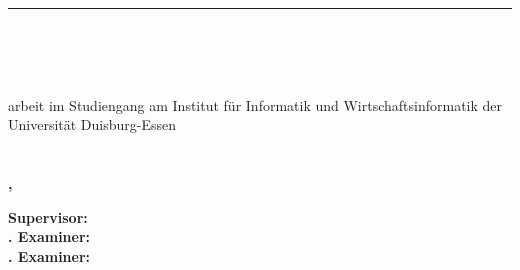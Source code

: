 %

\begin{titlepage}
\rule{\textwidth}{0.4pt} \\[48pt]
\begin{center}
\begin{spacing}{2}
\textbf{\textsf{\Huge \titel}} \\
\textsf{\Large \untertitel}\\[52pt]

\textsf{\Large {\arbeitsart}arbeit im Studiengang {\studiengang} am Institut für Informatik und
Wirtschaftsinformatik der Universität Duisburg-Essen}\\[36pt]
\textbf{\textsf{\Large {\vorname} {\nachname} \\ {\matrikelnummer}}}\\[26pt]
\textbf{\textsf{\Large {\ort}, \datum}}
\end{spacing}
\end{center}
\textbf{Supervisor: \betreuer \\
\ifx\erstgutachter\undefined
{}. Examiner: \erstgutachter \\
  \ifx\zweitgutachter\undefined
  . Examiner: \zweitgutachter \\
  \fi
\fi
}
\end{titlepage}